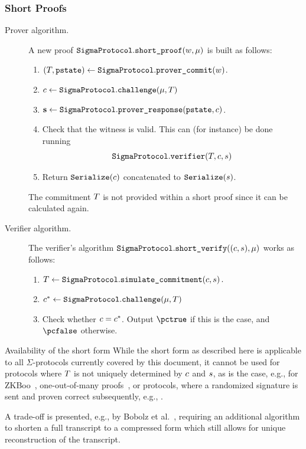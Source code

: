 \documentclass[11pt]{article}
\begin{document}
\subsubsection{Short Proofs}\label{sec:shortproof}
\begin{description}
\item[Prover algorithm.]
A new proof $\texttt{SigmaProtocol}.\texttt{short\_proof}(w, \mu)$ is built as follows:
\begin{enumerate}
  \item
     $(T,\texttt{pstate})\gets\texttt{SigmaProtocol}.\texttt{prover\_commit}(w)$.
  \item
   $c \gets \texttt{SigmaProtocol}.\texttt{challenge}(\mu,  T)$
  \item
     $\mathbf {s}\gets\texttt{SigmaProtocol}.\texttt{prover\_response}(\texttt{pstate},c)$.
    \item Check that the witness is valid. This can (for instance) be done running \[\texttt{SigmaProtocol}.\texttt{verifier}(T, c, s)\]
  \item
  Return $\texttt{Serialize}(c)$ concatenated to $\texttt{Serialize}(s)$.
\end{enumerate}
The commitment $T$ is not provided within a short proof since it can be calculated again.
\item[Verifier algorithm.] The verifier's algorithm $\texttt{SigmaProtocol}.\texttt{short\_verify}( (c, s), \mu)$ works as follows:
\begin{enumerate}
  \item $T \gets \texttt{SigmaProtocol}.\texttt{simulate\_commitment}(c, s)\,.$
  \item $c^* \gets \texttt{SigmaProtocol}.\texttt{challenge}(\mu, T)$
  \item
  Check whether $c=c^*$.
  Output $\accept$ if this is the case, and $\reject$ otherwise.
\end{enumerate}
\end{description}

\begin{remark}{Availability of the short form}{}
  While the short form as described here is applicable to all $\Sigma$-protocols currently covered by this document, it cannot be used for protocols where $T$ is not uniquely determined by $c$ and $s$, as is the case, e.g., for ZKBoo~\cite{USENIX:GiaMadOrl16}, one-out-of-many proofs~\cite{EC:GroKoh15}, or protocols, where a randomized signature is sent and proven correct subsequently, e.g., \cite{RSA:PoiSan16,AC:CamChaShe08}.

  A trade-off is presented, e.g., by Bobolz et al.~\cite{EPRINT:BEHF21}, requiring an additional algorithm to shorten a full transcript to a compressed form which still allows for unique reconstruction of the transcript.
\end{remark}
\end{document}
